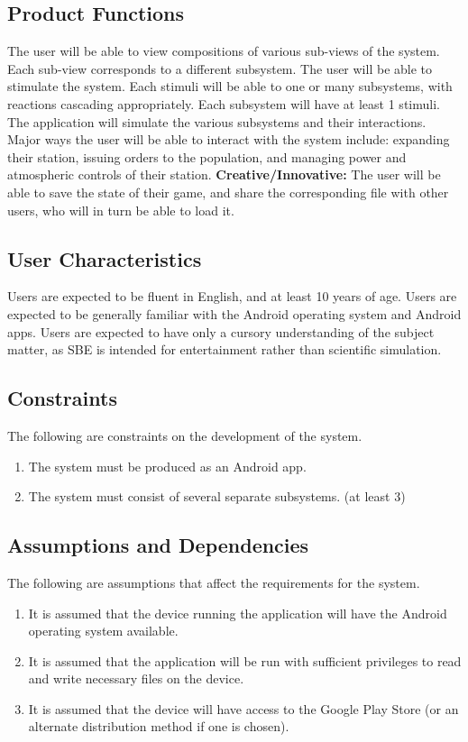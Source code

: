 \documentclass[]{article}
\begin{document}
\subsection{Product Functions}
\label{sub:product_functions}
The user will be able to view compositions of various sub-views of the system. Each sub-view corresponds to a different subsystem. The user will be able to stimulate the system. Each stimuli will be able to one or many subsystems, with reactions cascading appropriately. Each subsystem will have at least 1 stimuli. The application will simulate the various subsystems and their interactions. Major ways the user will be able to interact with the system include: expanding their station, issuing orders to the population, and managing power and atmospheric controls of their station. \textbf{Creative/Innovative:} The user will be able to save the state of their game, and share the corresponding file with other users, who will in turn be able to load it.

\subsection{User Characteristics}
\label{sub:user_characteristics}
	Users are expected to be fluent in English, and at least 10 years of age. Users are expected to be generally familiar with the Android operating system and Android apps. Users are expected to have only a cursory understanding of the subject matter, as SBE is intended for entertainment rather than scientific simulation.

\subsection{Constraints}
\label{sub:constraints}
	The following are constraints on the development of the system.
	\begin{enumerate}
		\item The system must be produced as an Android app.
		\item The system must consist of several separate subsystems. (at least 3)
	\end{enumerate}

\subsection{Assumptions and Dependencies}
\label{sub:assumptions_and_dependencies}
	The following are assumptions that affect the requirements for the system.
	\begin{enumerate}
	\item It is assumed that the device running the application will have the Android operating system available.
	\item It is assumed that the application will be run with sufficient privileges to read and write necessary files on the device.
	\item  It is assumed that the device will have access to the Google Play Store (or an alternate distribution method if one is chosen).
	\end{enumerate}
\end{document}
